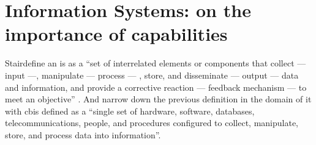 \documentclass[showtrims,oldfontcommands]{kthesis}
\begin{document}


\section{Information Systems: on the importance of capabilities}
    \label{section:information-systems-on-the-importance-of-capabilities}

Stair\etal define an \ac{is} as a ``set of interrelated elements or components 
that collect --- input ---, manipulate --- process --- , store, and disseminate 
--- output --- data and information, and provide a corrective reaction --- feedback 
mechanism --- to meet an objective'' \cite{StairR15}. And narrow down the previous 
definition in the domain of \ac{it} with \ac{cbis} defined as a ``single set of 
hardware, software, databases, telecommunications, people, and procedures configured 
to collect, manipulate, store, and process data into information''. 
\end{document}
